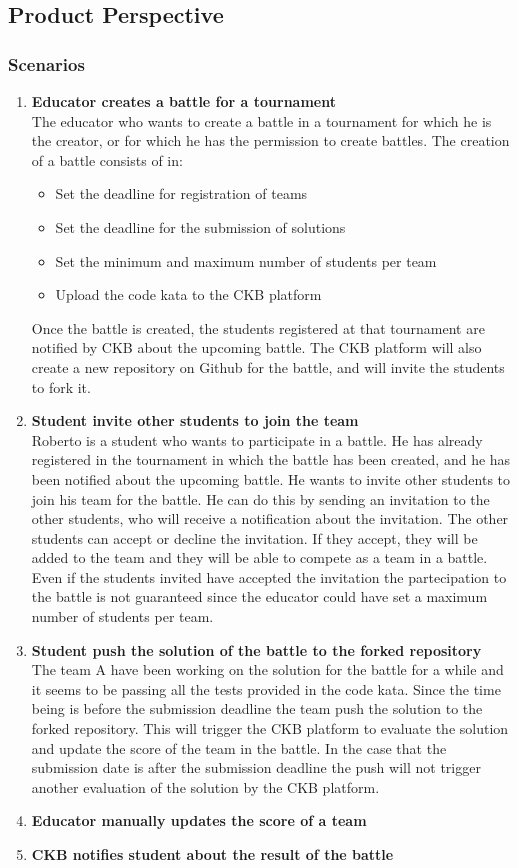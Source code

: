 \subsection{Product Perspective}
\subsubsection{Scenarios}
\begin{enumerate}
    \item \textbf{Educator creates a battle for a tournament} \\
    The educator who wants to create a battle in a tournament for which he is the creator, or for which he has the permission to create battles.
    The creation of a battle consists of in:
    \begin{itemize}
        \item Set the deadline for registration of teams
        \item Set the deadline for the submission of solutions
        \item Set the minimum and maximum number of students per team
        \item Upload the code kata to the CKB platform
    \end{itemize}
    Once the battle is created, the students registered at that tournament are notified by CKB about the upcoming battle. The CKB platform will also create a new repository on Github for the battle, and will invite the students to fork it.
    \item \textbf{Student invite other students to join the team} \\
    Roberto is a student who wants to participate in a battle. He has already registered in the tournament in which the battle has been created, and he has been notified about the upcoming battle. He wants to invite other students to join his team for the battle. He can do this by sending an invitation to the other students, who will receive a notification about the invitation. The other students can accept or decline the invitation. If they accept, they will be added to the team and they will be able to compete as a team in a battle.
    Even if the students invited have accepted the invitation the partecipation to the battle is not guaranteed since the educator could have set a maximum number of students per team.
    \item \textbf{Student push the solution of the battle to the forked repository} \\
    The team A have been working on the solution for the battle for a while and it seems to be passing all the tests provided in the code kata. Since the time being is before the submission deadline the team push the solution to the forked repository. This will trigger the CKB platform to evaluate the solution and update the score of the team in the battle. In the case that the submission date is after the submission deadline the push will not trigger another evaluation of the solution by the CKB platform.
    \item \textbf{Educator manually updates the score of a team}
    \item \textbf{CKB notifies student about the result of the battle}
\end{enumerate}
